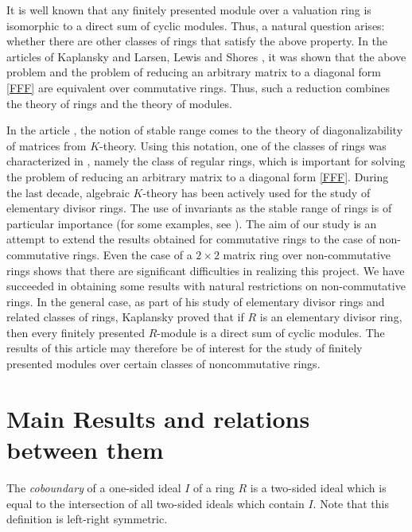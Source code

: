 \documentclass{cimart}
\begin{document}
It is well known \cite{Warfield} that any finitely presented module over a valuation ring is isomorphic to a direct sum of cyclic modules. Thus, a natural question arises: whether there are other classes of rings that satisfy the above property. In the articles of Kaplansky \cite {7-kaplansky} and Larsen, Lewis and Shores \cite{ Larsen_Lewis_Shores}, it was shown that the above problem and the problem of reducing an arbitrary matrix to a diagonal form \eqref{FFF} are equivalent over commutative rings. Thus, such a reduction   combines the theory of rings and the theory of modules.

In the article \cite{Menal_Moncasi}, the notion of stable range comes to the theory of diagonalizability of matrices from $K$-theory.  Using this notation,  one of the  classes of rings was characterized in \cite{Menal_Moncasi}, namely the class of regular rings, which is important for solving the problem of reducing an arbitrary matrix to a diagonal form \eqref{FFF}. During the last decade,  algebraic $K$-theory has been actively used for the  study  of elementary divisor rings. The use of  invariants as the stable range of rings is of  particular importance (for some examples, see \cite{Anderson_Juett_2012, Bovdi_Shchedryk_2, Bovdi_Shchedryk,  Juett_Williams_2017, 4-mcGovern,  Menal_Moncasi, Mortini_Rupp, Mon_Shchedryk, 4-zabavsky, 1-zabavsky,   Zabavsky_Gatalevych_19}). The aim of our study is an attempt to extend the results obtained for commutative rings to the case of non-commutative rings. Even the case of a  $2\times 2$  matrix ring over non-commutative rings shows that there are significant difficulties in realizing this project.  We have succeeded in obtaining some results with natural restrictions on non-commutative rings. In the general case, as part of his study of elementary divisor rings and related classes of rings, Kaplansky proved that if $R$ is an elementary divisor ring, then every finitely presented $R$-module is a direct sum of cyclic modules. The results of this article may therefore be of interest for the study of finitely presented modules over certain classes of noncommutative rings.





\section{Main Results and relations between them}



The {\it coboundary}  of a one-sided ideal $I$ of a ring $R$ is a  two-sided ideal which is equal to the intersection of all two-sided ideals which contain $I$.     Note that this definition is  left-right symmetric.
\end{document}
